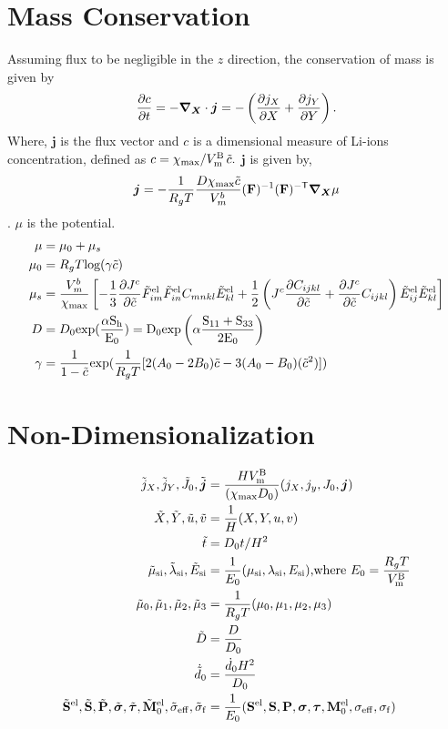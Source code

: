 \documentclass[../main.tex]{subfiles}
\begin{document}
\section{Mass Conservation}
Assuming flux to be negligible in the $z$ direction, the conservation of mass is given by
\begin{gather}
    \frac{\partial c}{\partial t} = - \bm{\nabla}_{\bm{X}} \cdot \bm{j} = -\left(\frac{\partial j_X}{\partial X} + \frac{\partial j_Y}{\partial Y}\right).
\end{gather}
Where, $\bm{j}$ is the flux vector and $c$ is a dimensional measure of Li-ions concentration, defined as 
\begin{math}
    c = \chi_{{\rm{max}}}/V_{\rm{m}}^{\rm{B}} \, \tilde{c}.
\end{math}
$\bm{j}$ is given by,
\begin{gather}
    \bm{j} = - \frac{1}{R_g T} \frac{D\chi_{{\rm{max}}} \tilde{c}}{V^b_m} (\mathbf{F})^{-1} (\mathbf{F})^{{-\sf {T}}} \bm{\nabla}_{\bm{X}} \mu
\end{gather}.
$\mu$ is the potential.
\begin{align}
    \mu &= \mu_0 + \mu_s \\
    \mu_0 &= R_g T \text{log}(\gamma \tilde{c}) \\
    \mu_s &= \frac{V_m^b}{\chi_{{\rm{max}}}}\left[-\frac{1}{3}\frac{\partial {J^c}}{\partial \tilde{c}}\tilde{F}_{im}^{{\rm{el}}}\tilde{F}_{in}^{{\rm{el}}}{C}_{mnkl}\tilde{E}_{kl}^{{\rm{el}}} + \frac{1}{2}\left({J^c} \frac{\partial C_{ijkl}}{\partial \tilde{c}} + \frac{\partial {J^c}}{\partial \tilde{c}} C_{ijkl}\right)\tilde{E}_{ij}^{{\rm{el}}}\tilde{E}_{kl}^{{\rm{el}}}\right] \\
    D &= D_0 \rm{exp}(\frac{\alpha S_h}{E_0}) = D_0 \rm{exp}\left(\alpha \frac{{S}_{11}+{S}_{33}}{2 E_0}\right) \\ 
    \gamma &= \frac{1}{1-\tilde{c}}\text{exp}(\frac{1}{R_g T}[2(A_0 - 2B_0)\tilde{c} - 3(A_0 - B_0)(\tilde{c}^2)])
\end{align}
\section{Non-Dimensionalization}
\begin{align}
    \tilde{j}_X, \tilde{j}_Y, \tilde{J}_0, \tilde{\bm{j}} &=  \frac{H V_{\rm{m}}^{\rm{B}}}{(\chi_{{\rm{max}}} D_0)} (j_X, j_y, J_0, \bm{j}) \\
    \tilde{X}, \tilde{Y}, \tilde{u}, \tilde{v} &= \frac{1}{H}(X, Y, u, v) \\
    \tilde{t} &= D_0 t/H^2 \\
     \tilde{\mu}_{\text{si}}, \tilde{\lambda}_{\text{si}}, \tilde{E}_{\text{si}} &= \frac{1}{E_0} (\mu_{\text{si}}, \lambda_{\text{si}}, E_{\text{si}}) 
     \text{,where }  E_0 = \frac{R_g T}{V_{\rm{m}}^{\rm{B}}} \\
     \tilde{\mu}_0, \tilde{\mu}_1, \tilde{\mu}_2, \tilde{\mu}_3 &= \frac{1}{R_g T}(\mu_0, \mu_1, \mu_2, \mu_3) \\
     \tilde{D} &= \frac{D}{D_0} \\
     \dot{\tilde{d}}_{0} &= \frac{{\dot{d}}_0 H^2}{D_0} \\
     \tilde{\mathbf{S}}^{{\rm{el}}}, \tilde{\mathbf{S}}, \tilde{\mathbf{P}}, \tilde{\bm{\sigma}}, \tilde{\bm{\tau}}, \tilde{\mathbf{M}}^{{\rm{el}}}_{0}, \tilde{\sigma}_{\rm{eff}}, \tilde{\sigma}_{\rm{f}} &= \frac{1}{E_0}(\mathbf{S}^{{\rm{el}}}, \mathbf{S}, \mathbf{P}, \bm{\sigma}, \bm{\tau}, \mathbf{M}^{{\rm{el}}}_{0}, \sigma_{\rm{eff}}, \sigma_{\rm{f}})
\end{align}
\end{document}
